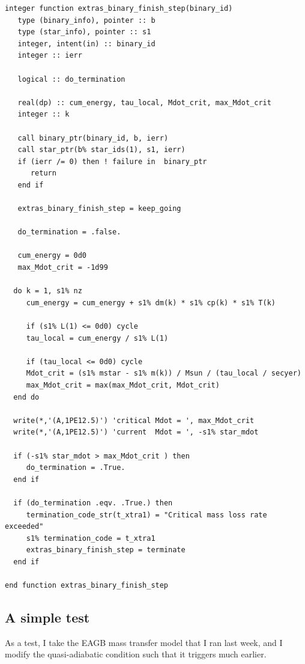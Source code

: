 \documentclass[a4paper,10pt]{article}
\begin{document}
\begin{verbatim}
integer function extras_binary_finish_step(binary_id)
   type (binary_info), pointer :: b
   type (star_info), pointer :: s1
   integer, intent(in) :: binary_id
   integer :: ierr

   logical :: do_termination

   real(dp) :: cum_energy, tau_local, Mdot_crit, max_Mdot_crit
   integer :: k

   call binary_ptr(binary_id, b, ierr)
   call star_ptr(b% star_ids(1), s1, ierr)
   if (ierr /= 0) then ! failure in  binary_ptr
      return
   end if
  
   extras_binary_finish_step = keep_going

   do_termination = .false.

   cum_energy = 0d0
   max_Mdot_crit = -1d99
  
  do k = 1, s1% nz
     cum_energy = cum_energy + s1% dm(k) * s1% cp(k) * s1% T(k)
  
     if (s1% L(1) <= 0d0) cycle
     tau_local = cum_energy / s1% L(1) 

     if (tau_local <= 0d0) cycle
     Mdot_crit = (s1% mstar - s1% m(k)) / Msun / (tau_local / secyer)
     max_Mdot_crit = max(max_Mdot_crit, Mdot_crit)
  end do

  write(*,'(A,1PE12.5)') 'critical Mdot = ', max_Mdot_crit
  write(*,'(A,1PE12.5)') 'current  Mdot = ', -s1% star_mdot 
  
  if (-s1% star_mdot > max_Mdot_crit ) then
     do_termination = .True.
  end if

  if (do_termination .eqv. .True.) then
     termination_code_str(t_xtra1) = "Critical mass loss rate exceeded"
     s1% termination_code = t_xtra1
     extras_binary_finish_step = terminate
  end if

end function extras_binary_finish_step
\end{verbatim}




\subsection{A simple test}
As a test, I take the EAGB mass transfer model that I ran last week, and I modify the quasi-adiabatic condition such that it triggers much earlier.
\end{document}
